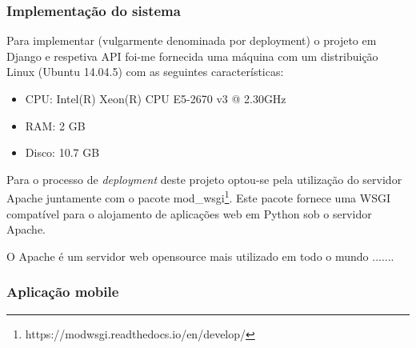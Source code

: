 \subsubsection{Implementação do sistema}

Para implementar (vulgarmente denominada por deployment) o projeto em Django e respetiva API foi-me fornecida uma máquina com um distribuição Linux (Ubuntu 14.04.5) com as seguintes características: 

\begin{itemize}
	\item \ac{CPU}: Intel(R) Xeon(R) CPU E5-2670 v3 @ 2.30GHz
	\item \ac{RAM}: 2 GB
	\item Disco: 10.7 GB
\end{itemize}


Para o processo de \textit{deployment} deste projeto optou-se pela utilização do servidor Apache juntamente com o pacote mod\_wsgi\footnote{https://modwsgi.readthedocs.io/en/develop/}. 
Este pacote fornece uma \ac{WSGI} compatível para o alojamento de aplicações web em Python sob o servidor Apache. 

O Apache é um servidor web opensource mais utilizado em todo o mundo .......

\cite{TheApacheSoftwareFoundation2016}

























\subsubsection{Aplicação mobile}


